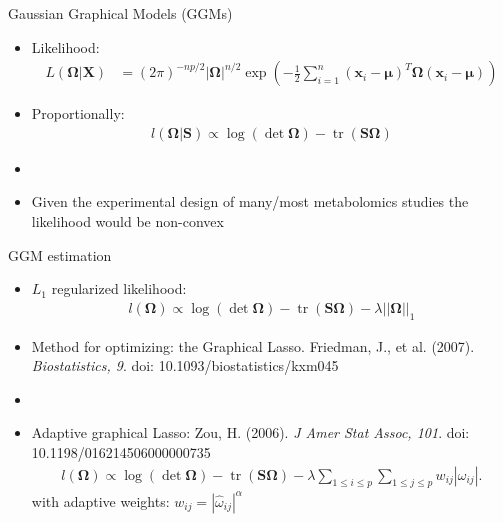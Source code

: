 \documentclass[xcolor=dvipsnames]{beamer}
\DeclareMathOperator{\tr}{tr}
\begin{document}
\begin{frame}{Gaussian Graphical Models (GGMs)}
	\vspace{-15.5pt}
	\begin{itemize}
		\item Likelihood:
		\begin{align*}
		L(\boldsymbol{\Omega}|\textbf{X})&=(2 \pi)^{-np/2}|\boldsymbol{\Omega}|^{n/2} \exp \left(-\frac{1}{2}\sum_{i=1}^{n} (\textbf{x}_i-\boldsymbol{\mu})^T \boldsymbol{\Omega} (\textbf{x}_i-\boldsymbol{\mu})\right) 
		\end{align*}\pause
		\item Proportionally:
		\begin{align*} 
		l(\boldsymbol{\Omega}|\textbf{S})\propto\log (\det \boldsymbol{\Omega})-\tr \left( \textbf{S} \boldsymbol{\Omega} \right)
		\end{align*}\pause
		\item[]
		\item Given the experimental design of many/most metabolomics studies the likelihood would be non-convex
	\end{itemize}
\end{frame}

\begin{frame}{GGM estimation}
	\vspace{-15.5pt}
	\begin{itemize}
		\item $L_1$ regularized likelihood:
		\begin{align*}
		l(\boldsymbol{\Omega})\propto\log (\det \boldsymbol{\Omega})-\tr \left( \textbf{S} \boldsymbol{\Omega} \right)-\lambda ||\boldsymbol{\Omega}||_1
		\end{align*}\pause
		\item Method for optimizing: the Graphical Lasso. Friedman, J., et al. (2007). \emph{Biostatistics, 9}. doi: 10.1093/biostatistics/kxm045 \pause
		\item[]
		\item Adaptive graphical Lasso: Zou, H. (2006).  \emph{J Amer Stat Assoc, 101}. doi: 10.1198/016214506000000735 
		\begin{align*}
				l(\boldsymbol{\Omega})\propto \log(\det \boldsymbol{\Omega})-\tr \left(\mathbf{S} \boldsymbol{\Omega}\right) - \lambda \sum_{1\leq i \leq p} \sum_{1 \leq j \leq p} w_{ij} |\omega_{ij}|.
		\end{align*}
		with adaptive weights: $w_{ij}=|\hat{\omega}_{ij}|^\alpha$
	\end{itemize}
\end{frame}
\end{document}
